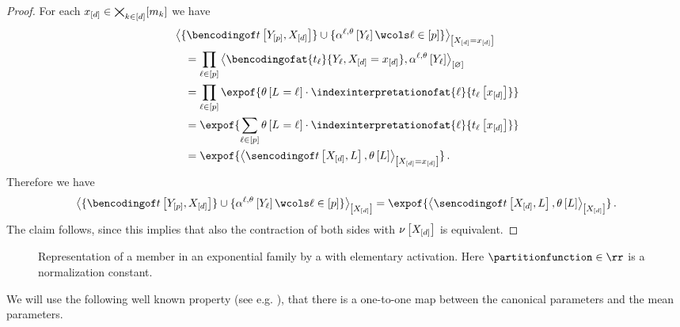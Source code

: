 \begin{proof} %
    For each $x_{[d]}\in\bigtimes_{k\in[d]}[m_{k}]$ we have
    \begin{align*}
        &\contractionof{\{\bencsstatwith\}\cup\{\softactlegwith \wcols \selindexin\}}{\indexedshortcatvariables} \\
        &\quad = \prod_{\selindexin} \contraction{\bencodingofat{\sstatcoordinateof{\selindex}}{\headvariableof{\selindex},\indexedshortcatvariables},\softactlegwith} \\
        &\quad = \prod_{\selindexin} \expof{\canparamat{\indexedselvariable}\cdot\indexinterpretationofat{\selindex}{\sstatcoordinateofat{\selindex}{\shortcatindices}}} \\
        &\quad = \expof{\sum_{\selindexin}\canparamat{\indexedselvariable}\cdot\indexinterpretationofat{\selindex}{\sstatcoordinateofat{\selindex}{\shortcatindices}}} \\
        &\quad = \expof{\contractionof{\sencsstatat{\shortcatvariables,\selvariable},\canparamwith}{\indexedshortcatvariables}} \, .
    \end{align*}
    Therefore we have
    \begin{align*}
        \contractionof{\{\bencsstatwith\}\cup\{\softactlegwith \wcols \selindexin\}}{\shortcatvariables}
        = \expof{\contractionof{\sencsstatat{\shortcatvariables,\selvariable},\canparamwith}{\shortcatvariables}} \, .
    \end{align*}
    The claim follows, since this implies that also the contraction of both sides with $\nu\left[X_{[d]}\right]$ is equivalent.
\end{proof}

\begin{figure}[t]
    \begin{center}
        
    \end{center}
    \caption{Representation of a member in an exponential family by a \ComputationActivationNetwork{} with elementary activation.
    Here $\partitionfunction\in\rr$ is a normalization constant.}\label{fig:expdistUnaryRealizable}
\end{figure}

We will use the following well known property (see e.g. \cite{brown_fundamentals_1987}), that there is a one-to-one map between the canonical parameters and the mean parameters.

